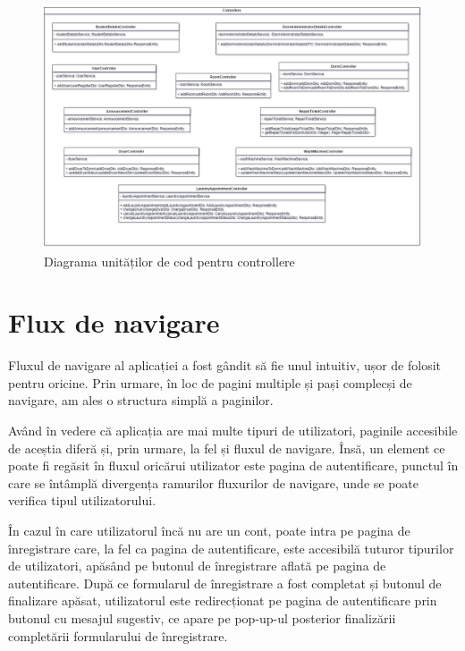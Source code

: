 \documentclass[12pt,a4paper]{report}
\theoremstyle{definition}
\theoremstyle{remark}
\begin{document}
\begin{figure}[H]
    \centering
    \includegraphics[width=1\linewidth]{resurse/diagrame/uvtdorms_d4.drawio.png}
    \caption{Diagrama unităților de cod pentru controllere}
\end{figure}

\section{Flux de navigare}
\par Fluxul de navigare al aplicației a fost gândit să fie unul intuitiv, ușor de folosit pentru oricine. Prin urmare, în loc de pagini multiple și pași complecși de navigare, am ales o structura simplă a paginilor.

\par Având în vedere că aplicația are mai multe tipuri de utilizatori, paginile accesibile de aceștia diferă și, prin urmare, la fel și fluxul de navigare. Însă, un element ce poate fi regăsit în fluxul oricărui utilizator este pagina de autentificare, punctul în care se întâmplă divergența ramurilor fluxurilor de navigare, unde se poate verifica tipul utilizatorului.

\par În cazul în care utilizatorul încă nu are un cont, poate intra pe pagina de înregistrare care, la fel ca pagina de autentificare, este accesibilă tuturor tipurilor de utilizatori, apăsând pe butonul de înregistrare aflată pe pagina de autentificare. După ce formularul de înregistrare a fost completat și butonul de finalizare apăsat, utilizatorul este redirecționat pe pagina de autentificare prin butonul cu mesajul sugestiv, ce apare pe pop-up-ul posterior finalizării completării formularului de înregistrare.
\end{document}

